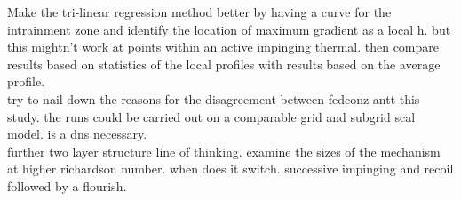 Make the tri-linear regression method better by having a curve for the intrainment zone and identify the location of maximum gradient as a local h.  but this mightn't work at points within an active impinging thermal.  then compare results based on statistics of the local profiles with results based on the average profile.\\

try to nail down the reasons for the disagreement between fedconz antt this study.  the runs could be carried out on a comparable grid and subgrid scal model. is a dns necessary. \\

further two layer structure line of thinking. examine the sizes of the mechanism at higher richardson number. when does it switch.  successive impinging and recoil followed by a flourish.\\

\FloatBarrier


\endinput

Any text after an \endinput is ignored.
You could put scraps here or things in progress.

